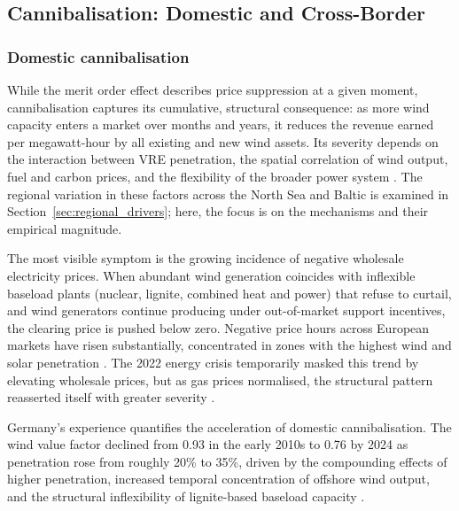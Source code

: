 \subsection{Cannibalisation: Domestic and Cross-Border}\label{sec:cannibalisation}

\subsubsection{Domestic cannibalisation}

While the merit order effect describes price suppression at a given moment, cannibalisation captures its cumulative, structural consequence: as more wind capacity enters a market over months and years, it reduces the revenue earned per megawatt-hour by all existing and new wind assets. Its severity depends on the interaction between VRE penetration, the spatial correlation of wind output, fuel and carbon prices, and the flexibility of the broader power system \cite{Hirth2013, Stiewe2025}. The regional variation in these factors across the North Sea and Baltic is examined in Section~\ref{sec:regional_drivers}; here, the focus is on the mechanisms and their empirical magnitude.

\vspace{4pt}

The most visible symptom is the growing incidence of negative wholesale electricity prices. When abundant wind generation coincides with inflexible baseload plants (nuclear, lignite, combined heat and power) that refuse to curtail, and wind generators continue producing under out-of-market support incentives, the clearing price is pushed below zero. Negative price hours across European markets have risen substantially, concentrated in zones with the highest wind and solar penetration \cite{Ember2025, EmberGlobal2024}. The 2022 energy crisis temporarily masked this trend by elevating wholesale prices, but as gas prices normalised, the structural pattern reasserted itself with greater severity \cite{Ruhnau2023}.

\vspace{4pt}

Germany's experience quantifies the acceleration of domestic cannibalisation. The wind value factor declined from 0.93 in the early 2010s to 0.76 by 2024 as penetration rose from roughly 20\% to 35\%, driven by the compounding effects of higher penetration, increased temporal concentration of offshore wind output, and the structural inflexibility of lignite-based baseload capacity \cite{Monteil2023, Stiewe2025, Ember2025}.

